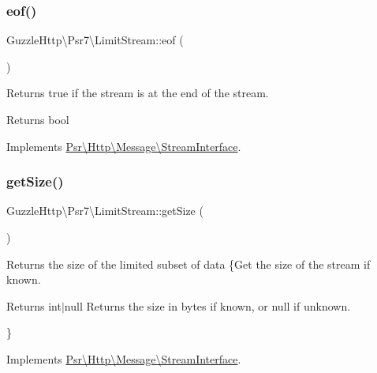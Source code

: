\subsubsection{\texorpdfstring{eof()}{eof()}}
{\footnotesize\ttfamily Guzzle\+Http\textbackslash{}\+Psr7\textbackslash{}\+Limit\+Stream\+::eof (\begin{DoxyParamCaption}{ }\end{DoxyParamCaption})}

Returns true if the stream is at the end of the stream.

\begin{DoxyReturn}{Returns}
bool 
\end{DoxyReturn}


Implements \hyperlink{interfacePsr_1_1Http_1_1Message_1_1StreamInterface_a502cc5ca370c6925b78d95d86d68777c}{Psr\textbackslash{}\+Http\textbackslash{}\+Message\textbackslash{}\+Stream\+Interface}.

\mbox{\label{classGuzzleHttp_1_1Psr7_1_1LimitStream_acdd9a4c2b17bfe31bb238fea5240cb5a}} 
\subsubsection{\texorpdfstring{get\+Size()}{getSize()}}
{\footnotesize\ttfamily Guzzle\+Http\textbackslash{}\+Psr7\textbackslash{}\+Limit\+Stream\+::get\+Size (\begin{DoxyParamCaption}{ }\end{DoxyParamCaption})}

Returns the size of the limited subset of data \{Get the size of the stream if known.

\begin{DoxyReturn}{Returns}
int$\vert$null Returns the size in bytes if known, or null if unknown.
\end{DoxyReturn}
\} 

Implements \hyperlink{interfacePsr_1_1Http_1_1Message_1_1StreamInterface_a85b9ff28e3ee39d95a47e623d866cf76}{Psr\textbackslash{}\+Http\textbackslash{}\+Message\textbackslash{}\+Stream\+Interface}.

\mbox{\label{classGuzzleHttp_1_1Psr7_1_1LimitStream_a5c6d3611a68073edd5927d82296d272f}} 
